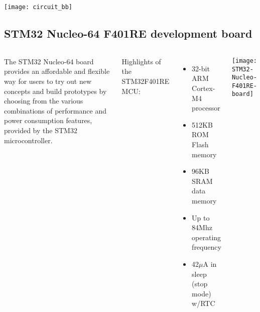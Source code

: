 \documentclass[aspectratio=169]{beamer}
\begin{document}
\begin{frame}{}
\begin{columns}
\end{columns}
\end{frame}


\begin{frame}{}
\hspace*{1cm}
\texttt{[image: circuit\_bb]}
\end{frame}





\subsection{STM32 Nucleo-64 F401RE development board}

\begin{frame}{}
\begin{columns}


\begin{block}{}
The STM32 Nucleo-64 board provides an affordable and flexible way for users to try out new concepts and build prototypes by choosing from the various combinations of performance and power consumption features, provided by the STM32 microcontroller.
\end{block}

\bigskip

Highlights of the STM32F401RE MCU:

\begin{itemize}
	
\item 32-bit ARM Cortex-M4 processor

\item 512KB ROM Flash memory

\item 96KB SRAM data memory

\item Up to 84Mhz operating frequency

\item 42$\mu$A in sleep (stop mode) w/RTC

\end{itemize}

\texttt{[image: STM32-Nucleo-F401RE-board]}

\end{columns}
\end{frame}
\end{document}
